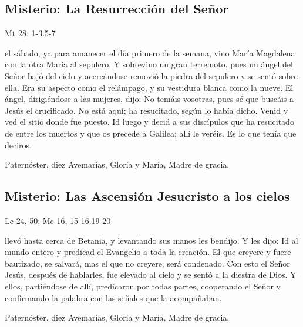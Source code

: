 \documentclass[./00_main.tex]{subfiles}
\newcounter{glorious-counter}
\begin{document}
\subsection*{ Misterio: La Resurrección del Señor}
\begin{flushright}
      {\color{red}Mt 28, 1-3.5-7}
\end{flushright}
 el sábado, ya para amanecer el día primero de la semana, vino María Magdalena con la otra María al sepulcro. Y sobrevino un gran terremoto, 
pues un ángel del Señor bajó del cielo y acercándose removió la piedra del sepulcro y se sentó sobre ella. Era su aspecto como el relámpago, y su vestidura blanca como la nueve. 
El ángel, dirigiéndose a las mujeres, dijo: No temáis vosotras, pues sé que buscáis a Jesús el crucificado. No está aquí; ha resucitado, según lo había dicho. 
Venid y ved el sitio donde fue puesto. Id luego y decid a sus discípulos que ha resucitado de entre los muertos y que os precede a Galilea; allí le veréis. 
Es lo que tenía que deciros.

\begin{center}
      Paternóster, diez Avemarías, Gloria y María, Madre de gracia.
\end{center}

\subsection*{ Misterio: Las Ascensión Jesucristo a los cielos}
\begin{flushright}
      {\color{red}Lc 24, 50; Mc 16, 15-16.19-20}
\end{flushright}
 llevó hasta cerca de Betania, y levantando sus manos les bendijo. Y les dijo: Id al mundo entero y predicad el Evangelio a toda la creación. 
El que creyere y fuere bautizado, se salvará, mas el que no creyere, será condenado. Con esto el Señor Jesús, después de hablarles, fue elevado al cielo y se sentó a la diestra de Dios. 
Y ellos, partiéndose de allí, predicaron por todas partes, cooperando el Señor y confirmando la palabra con las señales que la acompañaban.

\begin{center}
      Paternóster, diez Avemarías, Gloria y María, Madre de gracia.
\end{center}

\end{document}
